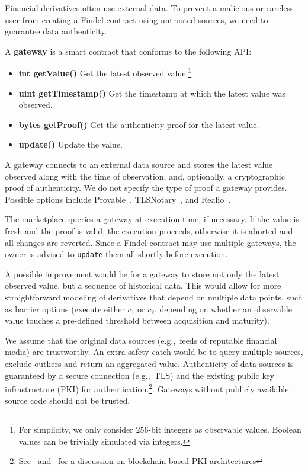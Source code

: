 Financial derivatives often use external data.
To prevent a malicious or careless user from creating a Findel contract using untrusted sources, we need to guarantee data authenticity.

\begin{definition}
	A \textbf{gateway} is a smart contract that conforms to the following API:
	
	\begin{itemize}
		\item \textbf{int getValue()} Get the latest observed value.\footnote{For simplicity, we only consider $256$-bit integers as observable values. Boolean values can be trivially simulated via integers.}
		\item \textbf{uint getTimestamp()} Get the timestamp at which the latest value was observed.
		\item \textbf{bytes getProof()} Get the authenticity proof for the latest value.
		\item \textbf{update()} Update the value.
	\end{itemize}
	
\end{definition}

A gateway connects to an external data source and stores the latest value observed along with the time of observation, and, optionally, a cryptographic proof of authenticity.
We do not specify the type of proof a gateway provides.
Possible options include Provable~\cite{Provable}, TLSNotary~\cite{TLSNotary}, and Realio~\cite{Realitio}.

The marketplace queries a gateway at execution time, if necessary. 
If the value is fresh and the proof is valid, the execution proceeds, otherwise it is aborted and all changes are reverted.
Since a Findel contract may use multiple gateways, the owner is advised to \texttt{update} them all shortly before execution.

A possible improvement would be for a gateway to store not only the latest observed value, but a sequence of historical data.
This would allow for more straightforward modeling of derivatives that depend on multiple data points, such as barrier options (execute either \(c_1\) or \(c_2\), depending on whether an observable value touches a pre-defined threshold between acquisition and maturity).

We assume that the original data sources (e.g.,~feeds of reputable financial media) are trustworthy.
An extra safety catch would be to query multiple sources, exclude outliers and return an aggregated value.
Authenticity of data sources is guaranteed by a secure connection (e.g.,~TLS) and the existing public key infrastructure (PKI) for authentication.\footnote{See~\cite{Fromknecht2014} and~\cite{Lewison2016} for a discussion on blockchain-based PKI architectures}.
Gateways without publicly available source code should not be trusted.


